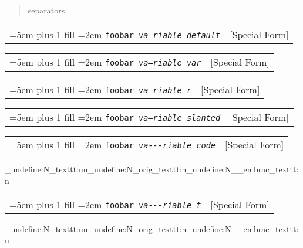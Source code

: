 \documentclass{book}
\newcommand\GNUTexinfocommandstyletextvar[1]{{\normalfont{}\textsl{#1}}}%
\begin{document}
%
\begin{quote}
\unskip{\parskip=0pt\noindent}%
separators
\end{quote}


\noindent\begin{tabularx}{\linewidth}{@{}Xr}
\rightskip=5em plus 1 fill
\hangindent=2em
\noindent\texttt{foobar \EmbracOn{}\textnormal{\textsl{va---riable default}}\EmbracOff{}}& [Special Form]
\end{tabularx}

%

\noindent\begin{tabularx}{\linewidth}{@{}Xr}
\rightskip=5em plus 1 fill
\hangindent=2em
\noindent\texttt{foobar \EmbracOn{}\textnormal{\textsl{\GNUTexinfocommandstyletextvar{va---riable} var}}\EmbracOff{}}& [Special Form]
\end{tabularx}

%

\noindent\begin{tabularx}{\linewidth}{@{}Xr}
\rightskip=5em plus 1 fill
\hangindent=2em
\noindent\texttt{foobar \EmbracOn{}\textnormal{\textsl{\EmbracOff{}\textnormal{va---riable}\EmbracOn{} r}}\EmbracOff{}}& [Special Form]
\end{tabularx}

%

\noindent\begin{tabularx}{\linewidth}{@{}Xr}
\rightskip=5em plus 1 fill
\hangindent=2em
\noindent\texttt{foobar \EmbracOn{}\textnormal{\textsl{\textsl{va---riable} slanted}}\EmbracOff{}}& [Special Form]
\end{tabularx}

%

%
\noindent\begin{tabularx}{\linewidth}{@{}Xr}
\rightskip=5em plus 1 fill
\hangindent=2em
\noindent\texttt{foobar \EmbracOn{}\textnormal{\textsl{\texttt{va{-}{-}{-}riable} code}}\EmbracOff{}}& [Special Form]
\end{tabularx}
\ExplSyntaxOn%
\cs_undefine:N{\embrac_texttt:nn}\cs_undefine:N{\embrac_orig_texttt:n}\cs_undefine:N{\__embrac_texttt:n}%
\ExplSyntaxOff%

%

%
\noindent\begin{tabularx}{\linewidth}{@{}Xr}
\rightskip=5em plus 1 fill
\hangindent=2em
\noindent\texttt{foobar \EmbracOn{}\textnormal{\textsl{\texttt{va{-}{-}{-}riable} t}}\EmbracOff{}}& [Special Form]
\end{tabularx}
\ExplSyntaxOn%
\cs_undefine:N{\embrac_texttt:nn}\cs_undefine:N{\embrac_orig_texttt:n}\cs_undefine:N{\__embrac_texttt:n}%
\ExplSyntaxOff%
\end{document}
